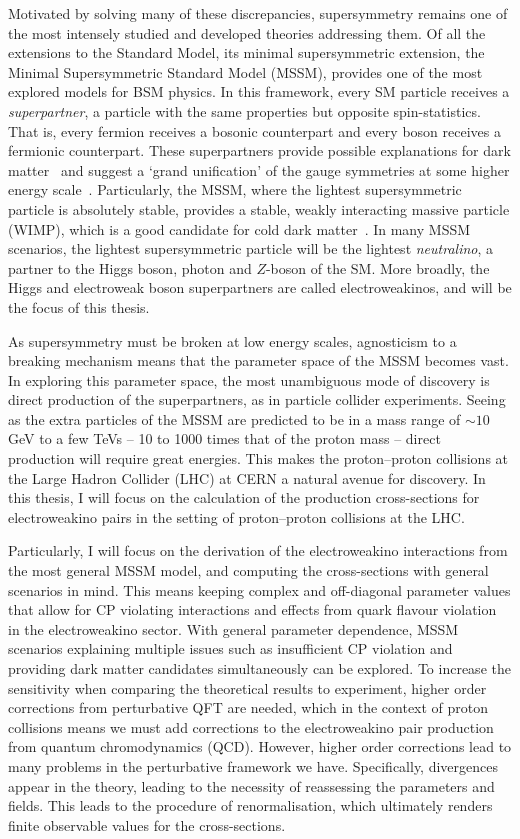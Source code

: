 Motivated by solving many of these discrepancies, supersymmetry remains one of the most intensely studied and developed theories addressing them.
Of all the extensions to the Standard Model, its minimal supersymmetric extension, the Minimal Supersymmetric Standard Model (MSSM), provides one of the most explored models for BSM physics.
In this framework, every SM particle receives a \emph{superpartner}, a particle with the same properties but opposite spin-statistics.
That is, every fermion receives a bosonic counterpart and every boson receives a fermionic counterpart.
These superpartners provide possible explanations for dark matter~\cite{susy_dark_matter} and suggest a `grand unification' of the gauge symmetries at some higher energy scale~\cite{susy_grand_unification}.
Particularly, the MSSM, where the lightest supersymmetric particle is absolutely stable, provides a stable, weakly interacting massive particle (WIMP), which is a good candidate for cold dark matter~\cite{WIMP}.
In many MSSM scenarios, the lightest supersymmetric particle will be the lightest \emph{neutralino}, a partner to the Higgs boson, photon and \(Z\)-boson of the SM\@.
More broadly, the Higgs and electroweak boson superpartners are called electroweakinos, and will be the focus of this thesis.
\medskip

As supersymmetry must be broken at low energy scales, agnosticism to a breaking mechanism means that the parameter space of the MSSM becomes vast.
In exploring this parameter space, the most unambiguous mode of discovery is direct production of the superpartners, as in particle collider experiments.
Seeing as the extra particles of the MSSM are predicted to be in a mass range of \(\sim 10\) GeV to a few TeVs -- 10 to 1000 times that of the proton mass -- direct production will require great energies.
This makes the proton--proton collisions at the Large Hadron Collider (LHC) at CERN a natural avenue for discovery.
In this thesis, I will focus on the calculation of the production cross-sections for electroweakino pairs in the setting of proton--proton collisions at the LHC\@.

Particularly, I will focus on the derivation of the electroweakino interactions from the most general MSSM model, and computing the cross-sections with general scenarios in mind.
This means keeping complex and off-diagonal parameter values that allow for CP violating interactions and effects from quark flavour violation in the electroweakino sector.
With general parameter dependence, MSSM scenarios explaining multiple issues such as insufficient CP violation and providing dark matter candidates simultaneously can be explored.
To increase the sensitivity when comparing the theoretical results to experiment, higher order corrections from perturbative QFT are needed, which in the context of proton collisions means we must add corrections to the electroweakino pair production from quantum chromodynamics (QCD).
However, higher order corrections lead to many problems in the perturbative framework we have.
Specifically, divergences appear in the theory, leading to the necessity of reassessing the parameters and fields.
This leads to the procedure of renormalisation, which ultimately renders finite observable values for the cross-sections.

